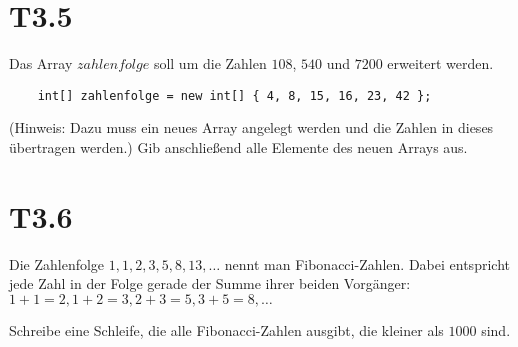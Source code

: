 \documentclass[final,a4paper]{article}
\begin{document}
\section*{T3.5}
	Das Array $zahlenfolge$ soll um die Zahlen $108$, $540$ und $7200$ erweitert werden.
	\begin{lstlisting}
	int[] zahlenfolge = new int[] { 4, 8, 15, 16, 23, 42 };
	\end{lstlisting}
	(Hinweis: Dazu muss ein neues Array angelegt werden und die Zahlen in dieses übertragen werden.)
	Gib anschließend alle Elemente des neuen Arrays aus.

\section*{T3.6}
	Die Zahlenfolge $1, 1, 2, 3, 5, 8, 13, \ldots$ nennt man Fibonacci-Zahlen. Dabei entspricht jede Zahl
	in der Folge gerade der Summe ihrer beiden Vorgänger: $1+1=2, 1+2=3, 2+3=5, 3+5=8, \ldots$

	Schreibe eine Schleife, die alle Fibonacci-Zahlen ausgibt, die kleiner als $1000$ sind.
\end{document}
